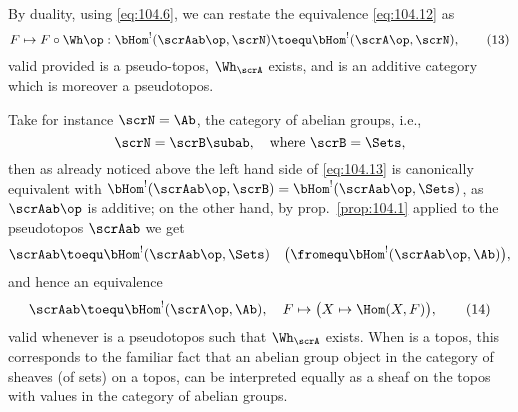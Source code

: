 By duality, using \eqref{eq:104.6}, we can restate the equivalence
\eqref{eq:104.12} as
\begin{equation}
  \label{eq:104.13}
  F\mapsto F\circ\Wh\op : \bHom^!(\scrAab\op,\scrN) \toequ
  \bHom^!(\scrA\op,\scrN),\tag{13}
\end{equation}
valid provided \scrA{} is a pseudo-topos, $\Wh_\scrA$ exists, and
\scrN{} is an additive category which is moreover a pseudotopos.

Take for instance $\scrN=\Ab$, the category of abelian groups, i.e.,
\[\scrN=\scrB\subab, \quad\text{where $\scrB=\Sets$,}\]
then as already noticed above the left hand side of \eqref{eq:104.13}
is canonically equivalent with
$\bHom^!(\scrAab\op,\scrB)=\bHom^!(\scrAab\op,\Sets)$, as
$\scrAab\op$ is additive; on the other hand, by prop.\
\ref{prop:104.1} applied to the pseudotopos $\scrAab$ we get
\[\scrAab\toequ \bHom^!(\scrAab\op,\Sets) \quad\bigl(\fromequ
\bHom^!(\scrAab\op,\Ab)\bigr),\]
and hence an equivalence
\begin{equation}
  \label{eq:104.14}
  \scrAab \toequ\bHom^!(\scrA\op,\Ab), \quad
  F\mapsto\bigl(X\mapsto\Hom(X,F)\bigr),\tag{14}
\end{equation}
valid whenever \scrA{} is a pseudotopos such that $\Wh_\scrA$
exists. When \scrA{} is a topos, this corresponds to the familiar fact
that an abelian group object in the category of sheaves (of sets) on a
topos, can be interpreted equally as a sheaf on the topos with values
in the category \Ab{} of abelian groups.

